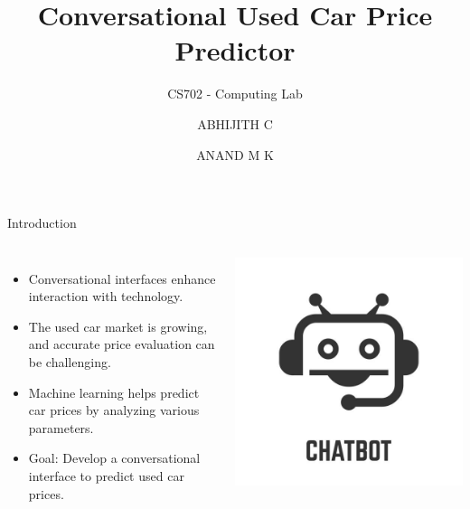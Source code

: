 \documentclass{beamer}
\title{Conversational Used Car Price Predictor}
\subtitle{CS702 - Computing Lab}
\author{ABHIJITH C \and ANAND M K}
\institute{Department of Computer Science and Engineering \\ NITK Surathkal}
\date{}  %
\begin{document}
\begin{frame}[t]
    \titlepage
\end{frame}

\begin{frame}[t]{Introduction}
    \begin{columns}
        \begin{itemize}
            \item Conversational interfaces enhance interaction with technology.
            \item The used car market is growing, and accurate price evaluation can be challenging.
            \item Machine learning helps predict car prices by analyzing various parameters.
            \item Goal: Develop a conversational interface to predict used car prices.
        \end{itemize}
        
        \centering
        \includegraphics[width=\linewidth]{Chatbot.jpg}  %
    \end{columns}
\end{frame}
\end{document}
